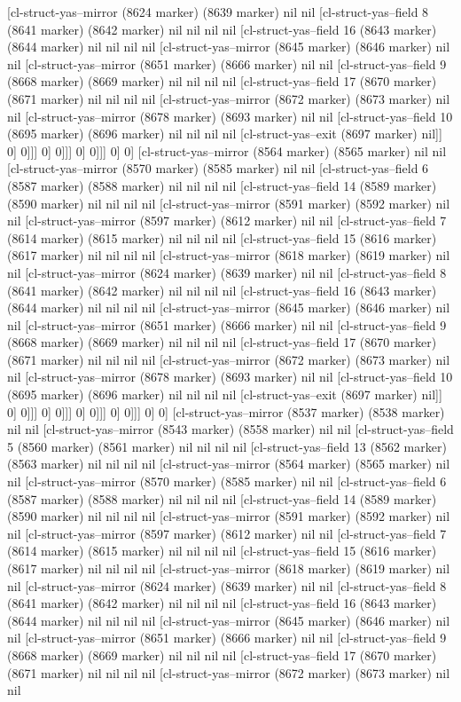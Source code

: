 {{[cl-struct-yas--mirror (8624 marker) (8639 marker) nil nil [cl-struct-yas--field 8 (8641 marker) (8642 marker) nil nil nil nil [cl-struct-yas--field 16 (8643 marker) (8644 marker) nil nil nil nil [cl-struct-yas--mirror (8645 marker) (8646 marker) nil nil [cl-struct-yas--mirror (8651 marker) (8666 marker) nil nil [cl-struct-yas--field 9 (8668 marker) (8669 marker) nil nil nil nil [cl-struct-yas--field 17 (8670 marker) (8671 marker) nil nil nil nil [cl-struct-yas--mirror (8672 marker) (8673 marker) nil nil [cl-struct-yas--mirror (8678 marker) (8693 marker) nil nil [cl-struct-yas--field 10 (8695 marker) (8696 marker) nil nil nil nil [cl-struct-yas--exit (8697 marker) nil]] 0] 0]]] 0] 0]]] 0] 0]]] 0] 0] [cl-struct-yas--mirror (8564 marker) (8565 marker) nil nil [cl-struct-yas--mirror (8570 marker) (8585 marker) nil nil [cl-struct-yas--field 6 (8587 marker) (8588 marker) nil nil nil nil [cl-struct-yas--field 14 (8589 marker) (8590 marker) nil nil nil nil [cl-struct-yas--mirror (8591 marker) (8592 marker) nil nil [cl-struct-yas--mirror (8597 marker) (8612 marker) nil nil [cl-struct-yas--field 7 (8614 marker) (8615 marker) nil nil nil nil [cl-struct-yas--field 15 (8616 marker) (8617 marker) nil nil nil nil [cl-struct-yas--mirror (8618 marker) (8619 marker) nil nil [cl-struct-yas--mirror (8624 marker) (8639 marker) nil nil [cl-struct-yas--field 8 (8641 marker) (8642 marker) nil nil nil nil [cl-struct-yas--field 16 (8643 marker) (8644 marker) nil nil nil nil [cl-struct-yas--mirror (8645 marker) (8646 marker) nil nil [cl-struct-yas--mirror (8651 marker) (8666 marker) nil nil [cl-struct-yas--field 9 (8668 marker) (8669 marker) nil nil nil nil [cl-struct-yas--field 17 (8670 marker) (8671 marker) nil nil nil nil [cl-struct-yas--mirror (8672 marker) (8673 marker) nil nil [cl-struct-yas--mirror (8678 marker) (8693 marker) nil nil [cl-struct-yas--field 10 (8695 marker) (8696 marker) nil nil nil nil [cl-struct-yas--exit (8697 marker) nil]] 0] 0]]] 0] 0]]] 0] 0]]] 0] 0]]] 0] 0] [cl-struct-yas--mirror (8537 marker) (8538 marker) nil nil [cl-struct-yas--mirror (8543 marker) (8558 marker) nil nil [cl-struct-yas--field 5 (8560 marker) (8561 marker) nil nil nil nil [cl-struct-yas--field 13 (8562 marker) (8563 marker) nil nil nil nil [cl-struct-yas--mirror (8564 marker) (8565 marker) nil nil [cl-struct-yas--mirror (8570 marker) (8585 marker) nil nil [cl-struct-yas--field 6 (8587 marker) (8588 marker) nil nil nil nil [cl-struct-yas--field 14 (8589 marker) (8590 marker) nil nil nil nil [cl-struct-yas--mirror (8591 marker) (8592 marker) nil nil [cl-struct-yas--mirror (8597 marker) (8612 marker) nil nil [cl-struct-yas--field 7 (8614 marker) (8615 marker) nil nil nil nil [cl-struct-yas--field 15 (8616 marker) (8617 marker) nil nil nil nil [cl-struct-yas--mirror (8618 marker) (8619 marker) nil nil [cl-struct-yas--mirror (8624 marker) (8639 marker) nil nil [cl-struct-yas--field 8 (8641 marker) (8642 marker) nil nil nil nil [cl-struct-yas--field 16 (8643 marker) (8644 marker) nil nil nil nil [cl-struct-yas--mirror (8645 marker) (8646 marker) nil nil [cl-struct-yas--mirror (8651 marker) (8666 marker) nil nil [cl-struct-yas--field 9 (8668 marker) (8669 marker) nil nil nil nil [cl-struct-yas--field 17 (8670 marker) (8671 marker) nil nil nil nil [cl-struct-yas--mirror (8672 marker) (8673 marker) nil nil }}
